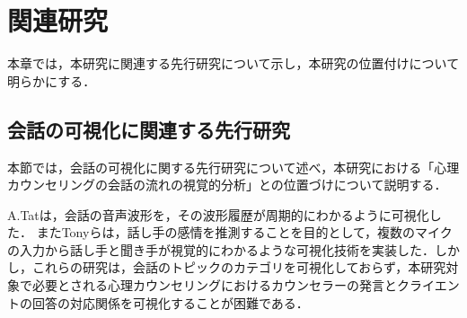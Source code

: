 \documentclass[shuuron]{kuee}
\begin{document}









\chapter{関連研究}%






本章では，本研究に関連する先行研究について示し，本研究の位置付けについて明らかにする．%

\section{会話の可視化に関連する先行研究}

本節では，会話の可視化に関する先行研究について述べ，本研究における「心理カウンセリングの会話の流れの視覚的分析」との位置づけについて説明する．%

A.Tat\cite{tat2002visualising}は，会話の音声波形を，その波形履歴が周期的にわかるように可視化した．
またTonyら\cite{bergstrom2007seeing}は，話し手の感情を推測することを目的として，複数のマイクの入力から話し手と聞き手が視覚的にわかるような可視化技術を実装した．しかし，これらの研究は，会話のトピックのカテゴリを可視化しておらず，本研究対象で必要とされる心理カウンセリングにおけるカウンセラーの発言とクライエントの回答の対応関係を可視化することが困難である．
\end{document}
